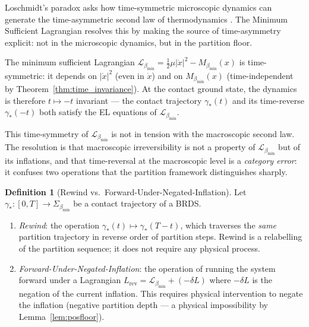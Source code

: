 \documentclass[12pt, a4paper]{article}
\theoremstyle{plain}
\theoremstyle{definition}
\newtheorem{definition}[theorem]{Definition}
\theoremstyle{remark}
\newcommand{\bmin}{\beta_{\min}}
\newcommand{\Lmin}{\mathcal{L}_{\bmin}}
\newcommand{\half}{\tfrac{1}{2}}
\begin{document}
Loschmidt's paradox asks how time-symmetric microscopic dynamics can generate
the time-asymmetric second law of thermodynamics \citep{boltzmann1896,zeh2007}.
The Minimum Sufficient Lagrangian resolves this by making the source of
time-asymmetry explicit: not in the microscopic dynamics, but in the partition
floor.

The minimum sufficient Lagrangian $\Lmin = \half\mu|\dot{x}|^2 - M_{\bmin}(x)$
is time-symmetric: it depends on $|\dot{x}|^2$ (even in $\dot{x}$) and on
$M_{\bmin}(x)$ (time-independent by Theorem~\ref{thm:time_invariance}). At the
contact ground state, the dynamics is therefore $t \mapsto -t$ invariant --- the
contact trajectory $\gamma_*(t)$ and its time-reverse $\gamma_*(-t)$ both
satisfy the EL equations of $\Lmin$.

This time-symmetry of $\Lmin$ is not in tension with the macroscopic second law.
The resolution is that macroscopic irreversibility is not a property of $\Lmin$
but of its inflations, and that time-reversal at the macroscopic level is a
\emph{category error}: it confuses two operations that the partition framework
distinguishes sharply.

\begin{definition}[Rewind vs.\ Forward-Under-Negated-Inflation]
\label{def:rewind}
Let $\gamma_*: [0, T] \to \Sigma_{\bmin}$ be a contact trajectory of a BRDS.
\begin{enumerate}[label=(\roman*)]
  \item \emph{Rewind}: the operation $\gamma_*(t) \mapsto \gamma_*(T - t)$,
  which traverses the \emph{same} partition trajectory in reverse order of
  partition steps. Rewind is a relabelling of the partition sequence; it does
  not require any physical process.
  \item \emph{Forward-Under-Negated-Inflation}: the operation of running the
  system forward under a Lagrangian $L_{\mathrm{rev}} = \Lmin + (-\delta L)$
  where $-\delta L$ is the negation of the current inflation. This requires
  physical intervention to negate the inflation (negative partition depth
  --- a physical impossibility by Lemma~\ref{lem:posfloor}).
\end{enumerate}
\end{definition}
\end{document}
